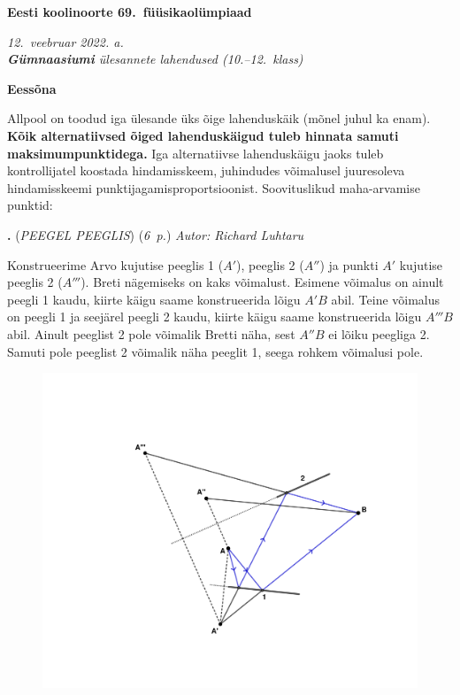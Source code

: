 \documentclass[11pt,a5paper]{article}
\newcommand{\numb}[1]{\vspace{5pt}\textbf{\large #1}}
\newcommand{\nimi}[1]{(\textsl{\small #1})}
\newcommand{\punktid}[1]{(\emph{#1~p.})}
\newcounter{ylesanne}
\newcommand{\yl}[1]{\addtocounter{ylesanne}{1}\numb{\theylesanne.} \nimi{#1} \newblock{}}
\newcommand{\autor}[1]{\emph{Autor: #1}}%
\begin{document}
\normalsize
\begin{center}
  \textbf{\Large Eesti koolinoorte 69.\ füüsikaolümpiaad} \par
  \emph{12.\ veebruar 2022. a.\\ \textbf{Gümnaasiumi} ülesannete lahendused (10.--12.\ klass)}
\end{center}

\normalsize

\numb{Eessõna}

Allpool on toodud iga ülesande üks õige lahenduskäik (mõnel juhul ka enam). \textbf{Kõik alternatiivsed õiged lahenduskäigud tuleb hinnata samuti maksimumpunktidega.} Iga alternatiivse lahenduskäigu jaoks tuleb kontrollijatel koostada hindamisskeem, juhindudes võimalusel juuresoleva hindamisskeemi punktijagamisproportsioonist. Soovituslikud maha-arvamise punktid:

\yl{PEEGEL PEEGLIS}
\punktid{6} \autor{Richard Luhtaru}

Konstrueerime Arvo kujutise peeglis 1 ($A'$), peeglis 2 ($A''$) ja punkti $A'$ kujutise peeglis 2 ($A'''$). Breti nägemiseks on kaks võimalust. Esimene võimalus on ainult peegli 1 kaudu, kiirte käigu saame konstrueerida lõigu $A'B$ abil. Teine võimalus on peegli 1 ja seejärel peegli 2 kaudu, kiirte käigu saame konstrueerida lõigu $A'''B$ abil. Ainult peeglist 2 pole võimalik Bretti näha, sest $A''B$ ei lõiku peegliga 2. Samuti pole peeglist 2 võimalik näha peeglit 1, seega rohkem võimalusi pole.

\begin{figure}[h]
    \centering
    \includegraphics[width=\textwidth, trim=0 50 0 50, clip]{spiegel_lah_joonis}
\end{figure}
\end{document}
